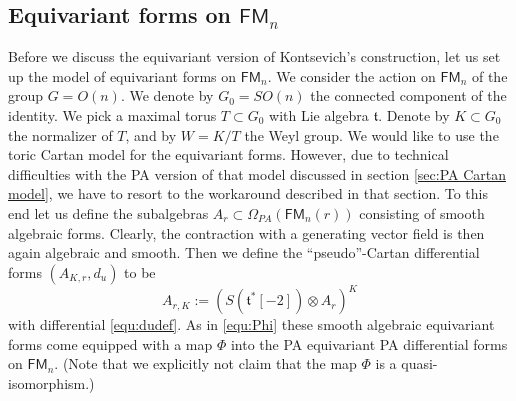 \documentclass[a4paper]{amsart}
\theoremstyle{plain}
\theoremstyle{definition}
\newcommand{\alg}[1]{\mathfrak{{#1}}}
\newcommand{\FM}{\mathsf{FM}}
\newcommand{\SO}{\mathit{SO}}
\begin{document}
\subsection{Equivariant forms on \texorpdfstring{$\FM_n$}{FMn}}\label{sec:equivariant forms FMn}
Before we discuss the equivariant version of Kontsevich's construction, let us set up the model of equivariant forms on $\FM_n$.
We consider the action on $\FM_n$ of the group $G= O(n)$.
We denote by $G_0=\SO(n)$ the connected component of the identity.
We pick a maximal torus $T\subset G_0$ with Lie algebra $\alg t$. Denote by $K\subset G_0$ the normalizer of $T$, and by $W=K/T$ the Weyl group.
We would like to use the toric Cartan model for the equivariant forms. 
However, due to technical difficulties with the PA version of that model discussed in section \ref{sec:PA Cartan model}, we have to resort to the workaround described in that section.
To this end let us define the subalgebras $A_r\subset \Omega_{PA}(\FM_n(r))$ consisting of smooth algebraic forms.
Clearly, the contraction with a generating vector field is then again algebraic and smooth.
Then we define the ``pseudo''-Cartan differential forms $(A_{K,r},d_u)$ to be 
\[
A_{r,K} := (S(\alg t^*[-2])\otimes A_r)^K
\]
with differential \eqref{equ:dudef}. As in \eqref{equ:Phi} these smooth algebraic equivariant forms come equipped with a map $\Phi$ into the PA equivariant PA differential forms on $\FM_n$.
(Note that we explicitly not claim that the map $\Phi$ is a quasi-isomorphism.)


% 
\end{document}
